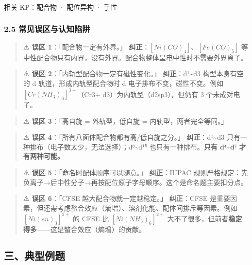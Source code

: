 \documentclass[a4paper,11pt]{ctexart}
\begin{document}
相关 KP：配合物 · 配位异构 · 手性

\subsubsection{2.5 常见误区与认知陷阱}\label{ux5e38ux89c1ux8befux533aux4e0eux8ba4ux77e5ux9677ux9631}

\begin{quote}
⚠️ \textbf{误区 1}：「配合物一定有外界。」
\textbf{纠正}：\([Ni(CO)_4]\)、\([Fe(CO)_5]\) 等中性配合物只有内界，没有外界。配合物整体呈电中性时不需要外界离子。
\end{quote}

\begin{quote}
⚠️ \textbf{误区 2}：「内轨型配合物一定有磁性变化。」
\textbf{纠正}：d¹\textasciitilde d3 构型本身有空的 d 轨道，形成内轨型配合物时 d 电子排布不变，磁性不变。例如 \([Cr(NH_3)_6]^{3+}\)（Cr3+ d3）为内轨型（d2sp3），但仍有 3 个未成对电子。
\end{quote}

\begin{quote}
⚠️ \textbf{误区 3}：「高自旋 = 外轨型，低自旋 = 内轨型，两者完全等同。」
\end{quote}

\begin{quote}
⚠️ \textbf{误区 4}：「所有八面体配合物都有高/低自旋之分。」
\textbf{纠正}：d¹\textasciitilde d3 只有一种排布（电子数太少，无法选择）；d⁸\textasciitilde d¹⁰ 也只有一种排布。\textbf{只有 d⁴\textasciitilde d⁷ 才有两种可能。}
\end{quote}

\begin{quote}
⚠️ \textbf{误区 5}：「命名时配体顺序可以随意。」
\textbf{纠正}：IUPAC 规则严格规定：先负离子→后中性分子→再按配位原子字母顺序。这个是命名题主要扣分点。
\end{quote}

\begin{quote}
⚠️ \textbf{误区 6}：「CFSE 越大配合物就一定越稳定。」
\textbf{纠正}：CFSE 是重要因素，但还需考虑螯合效应（熵增）、溶剂化能、配体间排斥等因素。例如 \([Ni(en)_3]^{2+}\) 的 CFSE 比 \([Ni(NH_3)_6]^{2+}\) 大不了很多，但前者\textbf{稳定得多}------这是螯合效应（熵增）的贡献。
\end{quote}

\subsection{三、典型例题}\label{ux4e09ux5178ux578bux4f8bux9898}
\end{document}
